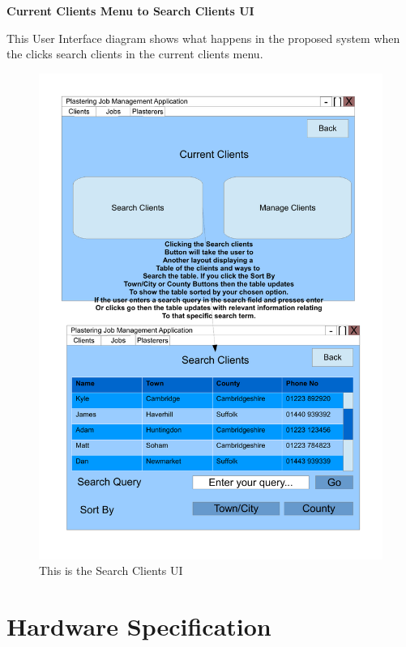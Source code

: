 \pagebreak
\textbf{Current Clients Menu to Search Clients UI}
\begin{flushleft}
This User Interface diagram shows what happens in the proposed system when the clicks search clients in the current clients menu.
\end{flushleft}
\begin{figure}[H]
\includegraphics[scale=0.5]{./Design/images/UI-SearchClients.pdf}
    \caption{This is the Search Clients UI} 
\label{fig:FlowChartNewClient}
\end{figure}






\pagebreak
\section{Hardware Specification}

